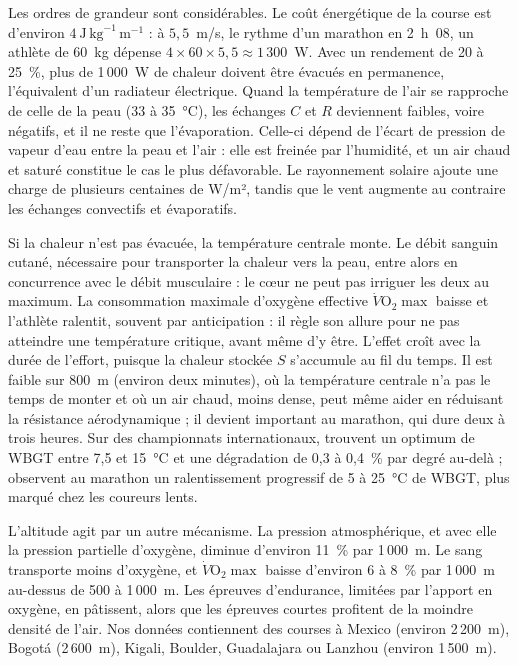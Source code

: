 \documentclass[11pt,a4paper]{article}
\begin{document}
Les ordres de grandeur sont considérables. Le coût énergétique de la course est d'environ
$4~\text{J}\,\text{kg}^{-1}\,\text{m}^{-1}$ : à $5{,}5$~m/s, le rythme d'un marathon en 2~h~08, un athlète de 60~kg
dépense $4 \times 60 \times 5{,}5 \approx 1\,300$~W. Avec un rendement de 20 à 25~\%, plus de 1\,000~W de chaleur
doivent être évacués en permanence, l'équivalent d'un radiateur électrique. Quand la température de l'air se
rapproche de celle de la peau (33 à 35~°C), les échanges $C$ et $R$ deviennent faibles, voire négatifs, et il ne
reste que l'évaporation. Celle-ci dépend de l'écart de pression de vapeur d'eau entre la peau et l'air : elle est
freinée par l'humidité, et un air chaud et saturé constitue le cas le plus défavorable. Le rayonnement solaire ajoute
une charge de plusieurs centaines de W/m², tandis que le vent augmente au contraire les échanges convectifs et
évaporatifs.

Si la chaleur n'est pas évacuée, la température centrale monte. Le débit sanguin cutané, nécessaire pour transporter
la chaleur vers la peau, entre alors en concurrence avec le débit musculaire : le cœur ne peut pas irriguer les deux
au maximum. La consommation maximale d'oxygène effective $\dot V\mathrm{O}_2\max$ baisse et l'athlète ralentit,
souvent par anticipation : il règle son allure pour ne pas atteindre une température critique, avant même d'y être.
L'effet croît avec la durée de l'effort, puisque la chaleur stockée $S$ s'accumule au fil du temps. Il est faible sur
800~m (environ deux minutes), où la température centrale n'a pas le temps de monter et où un air chaud, moins dense,
peut même aider en réduisant la résistance aérodynamique ; il devient important au marathon, qui dure deux à trois
heures. Sur des championnats internationaux, \citet{mantzios2022} trouvent un optimum de WBGT entre 7,5 et 15~°C et
une dégradation de 0,3 à 0,4~\% par degré au-delà ; \citet{ely2007} observent au marathon un ralentissement progressif
de 5 à 25~°C de WBGT, plus marqué chez les coureurs lents.

L'altitude agit par un autre mécanisme. La pression atmosphérique, et avec elle la pression partielle d'oxygène,
diminue d'environ 11~\% par 1\,000~m. Le sang transporte moins d'oxygène, et $\dot V\mathrm{O}_2\max$ baisse
d'environ 6 à 8~\% par 1\,000~m au-dessus de 500 à 1\,000~m. Les épreuves d'endurance, limitées par l'apport en
oxygène, en pâtissent, alors que les épreuves courtes profitent de la moindre densité de l'air. Nos données
contiennent des courses à Mexico (environ 2\,200~m), Bogotá (2\,600~m), Kigali, Boulder, Guadalajara ou Lanzhou
(environ 1\,500~m).
\end{document}
